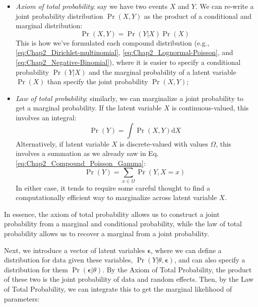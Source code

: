 \begin{itemize}
    \item \textit{Axiom of total probability}:  say we have two events \(X\) and \(Y\).  We can re-write a joint probability distribution \(\Pr(X,Y)\) as the product of a conditional and marginal distribution:
\begin{equation}
    \Pr(X,Y) = \Pr(Y|X) \Pr(X)
\end{equation}
    This is how we've formulated each compound distribution (e.g., \ref{eq:Chap2_Dirichlet-multinomial}, \ref{eq:Chap2_Lognormal-Poisson}, and \ref{eq:Chap2_Negative-Binomial}), where it is easier to specify a conditional probability \( \Pr(Y|X) \) and the marginal probability of a latent variable \( \Pr(X) \) than specify the joint probability \( \Pr(X,Y) \);
    
    \item \textit{Law of total probability}:  similarly, we can marginalize a joint probability to get a marginal probability.  If the latent variable \(X\) is continuous-valued, this involves an integral:
\begin{equation}
    \Pr(Y) = \int \Pr(X,Y) \mathrm{d} X    
\end{equation}
    Alternatively, if latent variable \(X\) is discrete-valued with values \( \Omega \), this involves a summation as we already saw in Eq. \ref{eq:Chap2_Compound_Poisson_Gamma}:
\begin{equation}
    \Pr(Y) = \sum_{x \in \Omega} \Pr(Y,X=x)    
\end{equation}
    In either case, it tends to require some careful thought to find a computationally efficient way to marginalize across latent variable \(X\).  

\end{itemize}
In essence, the axiom of total probability allows us to construct a joint probability from a marginal and conditional probability, while the law of total probability allows us to recover a marginal from a joint probability.  

Next, we introduce a vector of latent variables \( \mathbf{\epsilon} \), where we can define a distribution for data given these variables, \( \Pr(Y | \theta, \mathbf{\epsilon}) \), and can also specify a distribution for them \( \Pr( \mathbf{\epsilon} | \theta) \).  By the Axiom of Total Probability, the product of these two is the joint probability of data and random effects.  Then, by the Law of Total Probability, we can integrate this to get the marginal likelihood of parameters:

